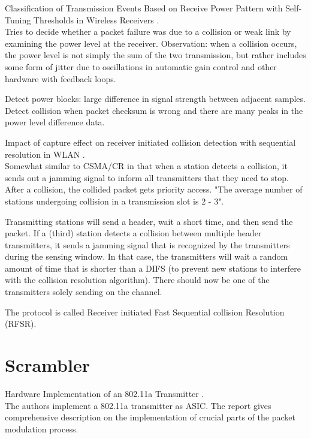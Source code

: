 Classification of Transmission Events Based on Receive Power Pattern with Self-Tuning Thresholds in Wireless Receivers \cite{chua2016}.\\

Tries to decide whether a packet failure was due to a collision or weak link by examining the power level at the receiver. Observation: when a collision occurs, the power level is not simply the sum of the two transmission, but rather includes some form of jitter due to oscillations in automatic gain control and other hardware with feedback loops.

Detect power blocks: large difference in signal strength between adjacent samples. Detect collision when packet checksum is wrong and there are many peaks in the power level difference data.

Impact of capture effect on receiver initiated collision detection with sequential resolution in WLAN \cite{jibukumar2015}.\\

Somewhat similar to CSMA/CR in that when a station detects a collision, it sends out a jamming signal to inform all transmitters that they need to stop. After a collision, the collided packet gets priority access. "The average number of stations undergoing collision in a transmission slot is 2 - 3".

Transmitting stations will send a header, wait a short time, and then send the packet. If a (third) station detects a collision between multiple header transmitters, it sends a jamming signal that is recognized by the transmitters during the sensing window. In that case, the transmitters will wait a random amount of time that is shorter than a DIFS (to prevent new stations to interfere with the collision resolution algorithm). There should now be one of the transmitters solely sending on the channel.

The protocol is called Receiver initiated Fast Sequential collision Resolution (RFSR).



\section{Scrambler}

Hardware Implementation of an 802.11a Transmitter \cite{basha2005}.\\

The authors implement a 802.11a transmitter as ASIC. The report gives comprehensive description on the implementation of crucial parts of the packet modulation process.

